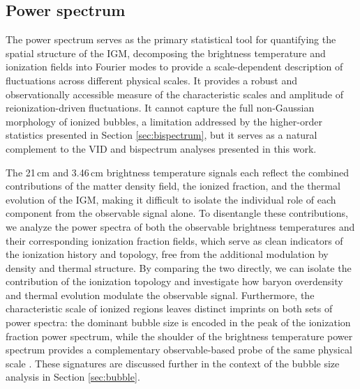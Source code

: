 \documentclass[apj,twocolumn, appendixfloats, twocolappendix, numberedappendix, tighten]{openjournal}
\begin{document}



\subsection{Power spectrum}

The power spectrum serves as the primary statistical tool for quantifying the spatial structure of the IGM, decomposing the brightness temperature and ionization fields into Fourier modes to provide a scale-dependent description of fluctuations across different physical scales. It provides a robust and observationally accessible measure of the characteristic scales and amplitude of reionization-driven fluctuations. It cannot capture the full non-Gaussian morphology of ionized  bubbles, a limitation addressed by the higher-order statistics presented in  Section \ref{sec:bispectrum}, but it serves as a natural complement to the  VID and bispectrum analyses presented in this work.


The 21\,cm and 3.46\,cm brightness temperature signals each reflect the combined contributions of the matter density field, the ionized fraction, and the thermal evolution of the IGM, making it difficult to isolate the individual role of each component from the observable signal alone. To disentangle these contributions, we analyze the power spectra of both the observable brightness temperatures and their corresponding ionization fraction fields, which serve as clean indicators of the ionization history and topology, free from the additional modulation by density and thermal structure. By comparing the two directly, we can isolate the contribution of the ionization topology and investigate how baryon overdensity and thermal evolution modulate the observable signal. Furthermore, the characteristic scale of ionized regions leaves distinct imprints on both sets of power spectra: the dominant bubble size is encoded in the peak of the ionization fraction power spectrum, while the shoulder of the brightness temperature power spectrum provides a complementary observable-based probe of the same physical scale \citep[][]{Furlanetto2006}. These signatures are discussed further in the context of the bubble size analysis in Section \ref{sec:bubble}.
\end{document}
